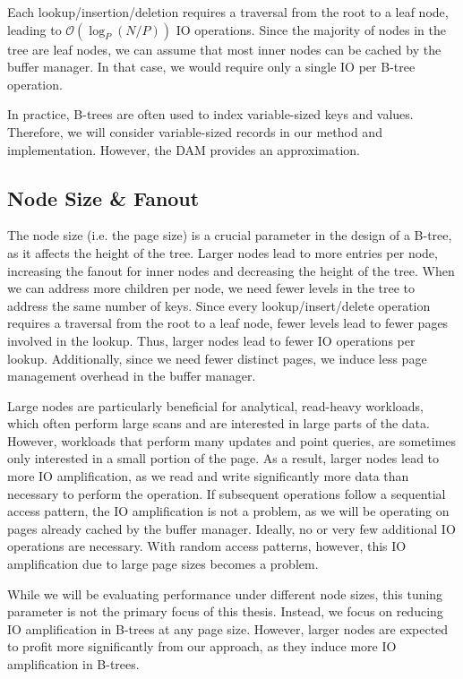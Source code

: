 Each lookup/insertion/deletion requires a traversal from the root to a leaf node, leading to $\mathcal{O}(\log_P(N/P))$ \ac{IO} operations.
Since the majority of nodes in the tree are leaf nodes, we can assume that most inner nodes can be cached by the buffer manager.
In that case, we would require only a single \ac{IO} per B-tree operation.

In practice, B-trees are often used to index variable-sized keys and values.
Therefore, we will consider variable-sized records in our method and implementation.
However, the \ac{DAM} provides an approximation.


\subsection*{Node Size \& Fanout}
\label{sec:node-size-fanout}
The node size (i.e. the page size) is a crucial parameter in the design of a B-tree, as it affects the height of the tree.
Larger nodes lead to more entries per node, increasing the fanout for inner nodes and decreasing the height of the tree.
When we can address more children per node, we need fewer levels in the tree to address the same number of keys.
Since every lookup/insert/delete operation requires a traversal from the root to a leaf node, fewer levels lead to fewer pages involved in the lookup.
Thus, larger nodes lead to fewer \ac{IO} operations per lookup.
Additionally, since we need fewer distinct pages, we induce less page management overhead in the buffer manager.

Large nodes are particularly beneficial for analytical, read-heavy workloads, which often perform large scans and are interested in large parts of the data.
However, workloads that perform many updates and point queries, are sometimes only interested in a small portion of the page.
As a result, larger nodes lead to more \ac{IO} amplification, as we read and write significantly more data than necessary to perform the operation.
If subsequent operations follow a sequential access pattern, the \ac{IO} amplification is not a problem, as we will be operating on pages already cached by the buffer manager.
Ideally, no or very few additional \ac{IO} operations are necessary.
With random access patterns, however, this \ac{IO} amplification due to large page sizes becomes a problem.

While we will be evaluating performance under different node sizes, this tuning parameter is not the primary focus of this thesis.
Instead, we focus on reducing \ac{IO} amplification in B-trees at any page size.
However, larger nodes are expected to profit more significantly from our approach, as they induce more \ac{IO} amplification in B-trees.


